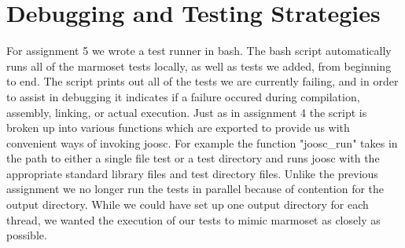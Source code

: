 \documentclass[12pt,letterpaper]{article}
\begin{document}
\section{Debugging and Testing Strategies}
For assignment 5 we wrote a test runner in bash.
The bash script automatically runs all of the marmoset tests locally, as well as tests we added, from beginning to end.
The script prints out all of the tests we are currently failing, and in order to assist in debugging it indicates if a failure occured during compilation, assembly, linking, or actual execution.
Just as in assignment 4 the script is broken up into various functions which are exported to provide us with convenient ways of invoking joosc.
For example the function "joosc\_run" takes in the path to either a single file test or a test directory and runs joosc with the appropriate standard library files and test directory files.
Unlike the previous assignment we no longer run the tests in parallel because of contention for the output directory.
While we could have set up one output directory for each thread, we wanted the execution of our tests to mimic marmoset as closely as possible.
\end{document}
